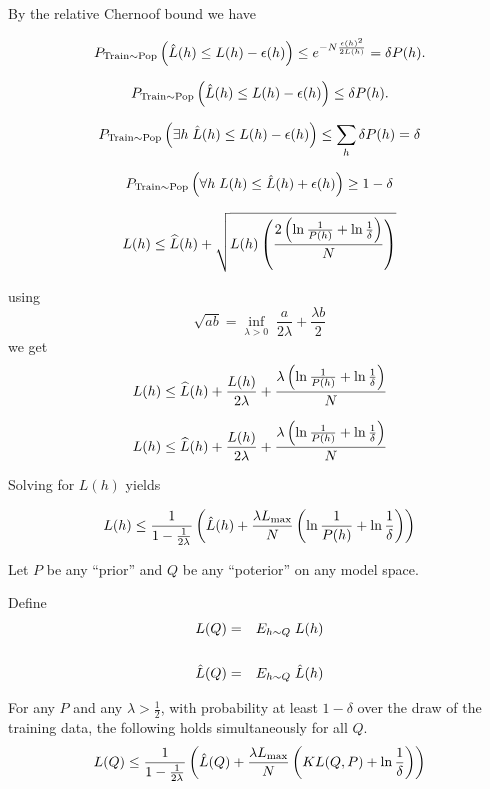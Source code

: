 {\vfill
By the relative Chernoof bound we have

\vfill
$$P_{\mathrm{Train} \sim \mathrm{Pop}}\left(\hat{L}(h) \leq L(h) - \epsilon(h)\right) \leq e^{-N\frac{\epsilon(h)^2}{2L(h)}} = \delta P(h).$$


$$P_{\mathrm{Train} \sim \mathrm{Pop}}\left(\hat{L}(h) \leq L(h) - \epsilon(h)\right) \leq \delta P(h).$$

\vfill
$$P_{\mathrm{Train} \sim \mathrm{Pop}}\left(\exists h\;\hat{L}(h) \leq L(h) - \epsilon(h)\right) \leq \sum_h \delta P(h) =\delta$$

\vfill
$$P_{\mathrm{Train} \sim \mathrm{Pop}}\left(\forall h\;L(h) \leq \hat{L}(h) + \epsilon(h)\right) \geq 1- \delta$$


$$L(h) \leq \widehat{L}(h) + \sqrt{L(h)\left(\frac{2\left(\ln\frac{1}{P(h)} + \ln\frac{1}{\delta}\right)}{N}\right)}$$

using
$$\sqrt{ab} = \inf_{\lambda > 0}\;\frac{a}{2\lambda} + \frac{\lambda b}{2}$$
\vfill
we get
$$L(h) \leq \widehat{L}(h) + \frac{L(h)}{2\lambda} + \frac{\lambda\left(\ln\frac{1}{P(h)} + \ln\frac{1}{\delta}\right)}{N}$$

$$L(h) \leq \widehat{L}(h) + \frac{L(h)}{2\lambda} + \frac{\lambda\left(\ln\frac{1}{P(h)} + \ln\frac{1}{\delta}\right)}{N}$$

\vfill
Solving for $L(h)$ yields

\vfill
$$L(h) \leq \frac{1}{1-\frac{1}{2\lambda}}\left(\hat{L}(h) + \frac{\lambda L_{\max}}{N}\left(\ln \frac{1}{P(h)} + \ln \frac{1}{\delta}\right)\right)$$


Let $P$ be any ``prior'' and $Q$ be any ``poterior'' on any model space.

\vfill
Define
\begin{eqnarray*}
  L(Q) & =  &E_{h \sim Q}\;L(h) \\
  \\
  \hat{L}(Q) & =  &E_{h \sim Q}\;\hat{L}(h)
\end{eqnarray*}


\vfill
For any $P$ and any $\lambda > \frac{1}{2}$, with probability
at least $1-\delta$ over the draw of the training data, the following holds simultaneously for all $Q$.
\vfill
$$L(Q) \leq \frac{1}{1-\frac{1}{2\lambda}}\left(\hat{L}(Q) + \frac{\lambda L_{\max}}{N}\left(KL(Q,P) + \ln \frac{1}{\delta}\right)\right)$$


}
